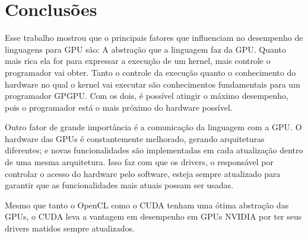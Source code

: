 \section{Conclusões}
Esse trabalho mostrou que o principais fatores que influenciam no desempenho de linguagens para GPU são:
A abstração que a linguagem faz da GPU. Quanto mais rica ela for para expressar a execução de um kernel, mais
controle o programador vai obter. Tanto o controle da execução quanto o conhecimento do hardware no qual o kernel vai
executar são conhecimentos fundamentais para um programador GPGPU. Com os dois, é possível atingir o máximo
desempenho, pois o programador está o mais próximo do hardware possível.

Outro fator de grande importância é a comunicação da linguagem com a GPU. O hardware das GPUs é constantemente
melhorado, gerando arquiteturas diferentes; e novas funcionalidades são implementadas em cada atualização dentro 
de uma mesma arquitetura. Isso faz com que os drivers, o responsável por controlar o acesso do hardware pelo software,
esteja sempre atualizado para garantir que as funcionalidades mais atuais possam ser usadas.

Mesmo que tanto o OpenCL como o CUDA tenham uma ótima abstração das GPUs, o CUDA leva a vantagem em desempenho em GPUs NVIDIA 
por ter seus drivers matidos sempre atualizados.
